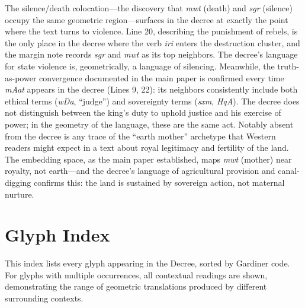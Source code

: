 \documentclass[11pt, a4paper]{article}
\begin{document}
The silence/death colocation---the discovery that \textit{mwt} (death) and \textit{sgr} (silence) occupy the same geometric region---surfaces in the decree at exactly the point where the text turns to violence. Line 20, describing the punishment of rebels, is the only place in the decree where the verb \textit{iri} enters the destruction cluster, and the margin note records \textit{sgr} and \textit{mwt} as its top neighbors. The decree's language for state violence is, geometrically, a language of silencing. Meanwhile, the truth-as-power convergence documented in the main paper is confirmed every time \textit{mAat} appears in the decree (Lines 9, 22): its neighbors consistently include both ethical terms (\textit{wDa}, ``judge'') and sovereignty terms (\textit{sxm}, \textit{HqA}). The decree does not distinguish between the king's duty to uphold justice and his exercise of power; in the geometry of the language, these are the same act. Notably absent from the decree is any trace of the ``earth mother'' archetype that Western readers might expect in a text about royal legitimacy and fertility of the land. The embedding space, as the main paper established, maps \textit{mwt} (mother) near royalty, not earth---and the decree's language of agricultural provision and canal-digging confirms this: the land is sustained by sovereign action, not maternal nurture.

\appendix
\section{Glyph Index}
\label{sec:glyph-index}

This index lists every glyph appearing in the Decree, sorted by Gardiner code. For glyphs with multiple occurrences, all contextual readings are shown, demonstrating the range of geometric translations produced by different surrounding contexts.

\vspace{8pt}
\end{document}
